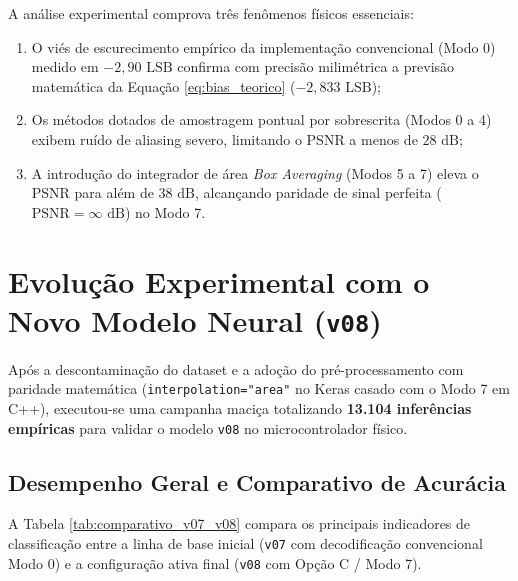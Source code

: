 A análise experimental comprova três fenômenos físicos essenciais:
\begin{enumerate}
    \item O viés de escurecimento empírico da implementação convencional (Modo 0) medido em $-2,90\text{ LSB}$ confirma com precisão milimétrica a previsão matemática da Equação \ref{eq:bias_teorico} ($-2,833\text{ LSB}$);
    \item Os métodos dotados de amostragem pontual por sobrescrita (Modos 0 a 4) exibem ruído de aliasing severo, limitando o PSNR a menos de $28\text{ dB}$;
    \item A introdução do integrador de área \textit{Box Averaging} (Modos 5 a 7) eleva o PSNR para além de $38\text{ dB}$, alcançando paridade de sinal perfeita ($\text{PSNR} = \infty\text{ dB}$) no Modo 7.
\end{enumerate}

\section{Evolução Experimental com o Novo Modelo Neural (\texttt{v08})}

Após a descontaminação do dataset e a adoção do pré-processamento com paridade matemática (\texttt{interpolation="area"} no Keras casado com o Modo 7 em C++), executou-se uma campanha maciça totalizando \textbf{13.104 inferências empíricas} para validar o modelo \texttt{v08} no microcontrolador físico.

\subsection{Desempenho Geral e Comparativo de Acurácia}

A Tabela \ref{tab:comparativo_v07_v08} compara os principais indicadores de classificação entre a linha de base inicial (\texttt{v07} com decodificação convencional Modo 0) e a configuração ativa final (\texttt{v08} com Opção C / Modo 7).

